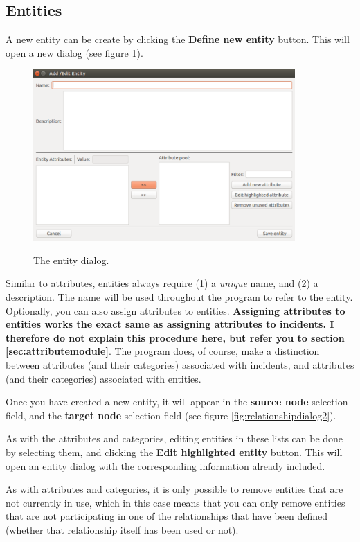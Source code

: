 \documentclass{memoir}
\begin{document}
\subsection{Entities}
\label{sec:entities}

A new entity can be create by clicking the \textbf{Define new entity} button. This will open a new dialog (see figure \ref{fig:entitydialog}).

\begin{figure}[h!]
  \centering
  \caption{The entity dialog.}
  \includegraphics[width=100mm]{Screenshot_16.pdf}
  \label{fig:entitydialog}
\end{figure}

Similar to attributes, entities always require (1) a \emph{unique} name, and (2) a description. The name will be used throughout the program to refer to the entity. Optionally, you can also assign attributes to entities. \textbf{Assigning attributes to entities works the exact same as assigning attributes to incidents. I therefore do not explain this procedure here, but refer you to section \ref{sec:attributemodule}}. The program does, of course, make a distinction between attributes (and their categories) associated with incidents, and attributes (and their categories) associated with entities. 

Once you have created a new entity, it will appear in the \textbf{source node} selection field, and the \textbf{target node} selection field (see figure \ref{fig:relationshipdialog2}).

As with the attributes and categories, editing entities in these lists can be done by selecting them, and clicking the \textbf{Edit highlighted entity} button. This will open an entity dialog with the corresponding information already included. 

As with attributes and categories, it is only possible to remove entities that are not currently in use, which in this case means that you can only remove entities that are not participating in one of the relationships that have been defined (whether that relationship itself has been used or not).
\end{document}
